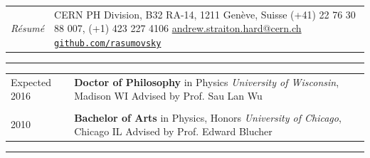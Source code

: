 \documentclass{letter}
\begin{document}
 


\begin{tabular}{p{}p{}}
	\hfill \newline \href{https://ch.linkedin.com/in/andrew-hard-25b690a5}{\Huge{\color{Maroon}{Andrew Hard}}} \newline \LARGE{\textit{R\'{e}sum\'{e}}} \newline
	&
	\hfill \newline CERN PH Division, B32 RA-14, 1211 Gen\`{e}ve, Suisse \newline
	(+41) 22 76 30 88 007, (+1) 423 227 4106 \newline
	\href{mailto:ahard@cern.ch}{andrew.straiton.hard@cern.ch} \newline
	\href{https://github.com/rasumovsky}{\texttt{github.com/rasumovsky}}\\
\end{tabular}

\begin{flushleft}
\Large{\textsc{\textbf{\color{Maroon}{Education}}}}
\hrule
\end{flushleft}

\begin{tabular}{p{}p{}}
	Expected 2016
	&
	\textbf{Doctor of Philosophy} in Physics \newline 
	\textit{University of Wisconsin}, Madison WI \newline
	Advised by Prof. Sau Lan Wu \\
\\
	2010 
	& 
	\textbf{Bachelor of Arts} in Physics, Honors \newline 
	\textit{University of Chicago}, Chicago IL \newline
	Advised by Prof. Edward Blucher 
\\
\end{tabular}

\begin{flushleft}
\Large{\textsc{\textbf{\color{Maroon}{Experience}}}}
\hrule
\end{flushleft}
\end{document}
